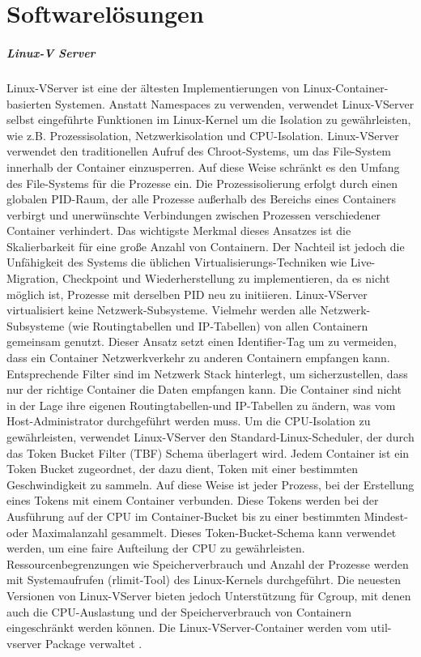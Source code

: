 \thispagestyle{empty}

\section{Softwarelösungen}

\subparagraph{Linux-V Server}
Linux-VServer ist eine der ältesten Implementierungen von Linux-Container-basierten Systemen. Anstatt Namespaces zu verwenden, verwendet Linux-VServer selbst eingeführte Funktionen im Linux-Kernel um die Isolation zu gewährleisten, wie z.B. Prozessisolation, Netzwerkisolation und CPU-Isolation. Linux-VServer verwendet den traditionellen Aufruf des Chroot-Systems, um das File-System innerhalb der Container einzusperren. Auf diese Weise schränkt es den Umfang des File-Systems für die Prozesse ein. Die Prozessisolierung erfolgt durch einen globalen PID-Raum, der alle Prozesse außerhalb des Bereichs eines Containers verbirgt und unerwünschte Verbindungen zwischen Prozessen verschiedener Container verhindert. Das wichtigste Merkmal dieses Ansatzes ist die Skalierbarkeit für eine große Anzahl von Containern. Der Nachteil ist jedoch die Unfähigkeit des Systems die üblichen Virtualisierungs-Techniken wie Live-Migration, Checkpoint und Wiederherstellung zu implementieren, da es nicht möglich ist, Prozesse mit derselben PID neu zu initiieren. Linux-VServer virtualisiert keine Netzwerk-Subsysteme. Vielmehr werden alle Netzwerk-Subsysteme (wie Routingtabellen und IP-Tabellen) von allen Containern gemeinsam genutzt. Dieser Ansatz setzt einen Identifier-Tag um zu vermeiden, dass ein Container Netzwerkverkehr zu anderen Containern empfangen kann. Entsprechende Filter sind im Netzwerk Stack hinterlegt, um sicherzustellen, dass nur der richtige Container die Daten empfangen kann. Die Container sind nicht in der Lage ihre eigenen Routingtabellen-und IP-Tabellen zu ändern, was vom Host-Administrator durchgeführt werden muss. Um die CPU-Isolation zu gewährleisten, verwendet Linux-VServer den Standard-Linux-Scheduler, der durch das Token Bucket Filter (TBF) Schema überlagert wird. Jedem Container ist ein Token Bucket zugeordnet, der dazu dient, Token mit einer bestimmten Geschwindigkeit zu sammeln. Auf diese Weise ist jeder Prozess, bei der Erstellung eines Tokens mit einem Container verbunden. Diese Tokens werden bei der Ausführung auf der CPU im Container-Bucket bis zu einer bestimmten Mindest- oder Maximalanzahl gesammelt. Dieses Token-Bucket-Schema kann verwendet werden, um eine faire Aufteilung der CPU zu gewährleisten. Ressourcenbegrenzungen wie Speicherverbrauch und Anzahl der Prozesse werden mit Systemaufrufen (rlimit-Tool) des Linux-Kernels durchgeführt. Die neuesten Versionen von Linux-VServer bieten jedoch Unterstützung für Cgroup, mit denen auch die CPU-Auslastung und der Speicherverbrauch von Containern eingeschränkt werden können. Die Linux-VServer-Container werden vom util-vserver\cite{Optionen2018Userspace-WerkzeugeLinux-VServer} Package verwaltet \cite{Overview2018PaperLinux-VServer} \cite{Xavier2015AClouds}.


